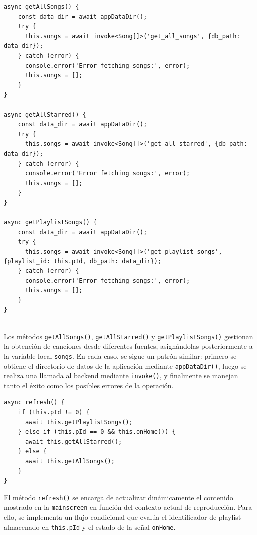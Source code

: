 \documentclass[11pt, a4paper]{article}
\begin{document}
                \begin{lstlisting}[caption={Obtención de playlists}]
async getAllSongs() {
    const data_dir = await appDataDir();
    try {
      this.songs = await invoke<Song[]>('get_all_songs', {db_path: data_dir});
    } catch (error) {
      console.error('Error fetching songs:', error);
      this.songs = [];
    }
}

async getAllStarred() {
    const data_dir = await appDataDir();
    try {
      this.songs = await invoke<Song[]>('get_all_starred', {db_path: data_dir});
    } catch (error) {
      console.error('Error fetching songs:', error);
      this.songs = [];
    }
}

async getPlaylistSongs() {
    const data_dir = await appDataDir();
    try {
      this.songs = await invoke<Song[]>('get_playlist_songs', {playlist_id: this.pId, db_path: data_dir});
    } catch (error) {
      console.error('Error fetching songs:', error);
      this.songs = [];
    }
}
                \end{lstlisting}
                ‎ \\

                Los métodos \texttt{getAllSongs()}, \texttt{getAllStarred()} y \texttt{getPlaylistSongs()} gestionan la obtención de canciones desde diferentes fuentes, asignándolas posteriormente a la variable local \texttt{songs}. En cada caso, se sigue un patrón similar: primero se obtiene el directorio de datos de la aplicación mediante \texttt{appDataDir()}, luego se realiza una llamada al backend mediante \texttt{invoke()}, y finalmente se manejan tanto el éxito como los posibles errores de la operación. \\

                \begin{lstlisting}[caption={refresh()}]
async refresh() {
    if (this.pId != 0) {
      await this.getPlaylistSongs();
    } else if (this.pId == 0 && this.onHome()) {
      await this.getAllStarred();
    } else {
      await this.getAllSongs();
    }
}
                \end{lstlisting}

                El método \texttt{refresh()} se encarga de actualizar dinámicamente el contenido mostrado en la \texttt{mainscreen} en función del contexto actual de reproducción. Para ello, se implementa un flujo condicional que evalúa el identificador de playlist almacenado en \texttt{this.pId} y el estado de la señal \texttt{onHome}. \\
\end{document}
